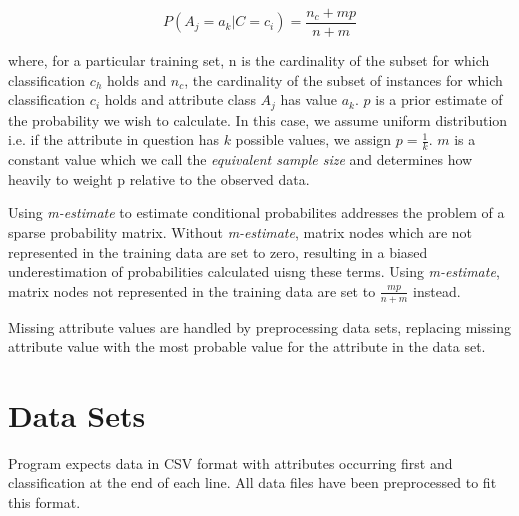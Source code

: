 \documentclass[10pt]{report}
\begin{document}
\begin{equation*}
P(A_{j}=a_{k}|C=c_{i}) = \frac{n_{c} + mp}{n + m}
\end{equation*}

where, for a particular training set, n is the cardinality of the
subset for which classification \(c_h\) holds and \(n_c\), the
cardinality of the subset of instances for which classification
\(c_i\) holds and attribute class \(A_j\) has value \(a_k\). \(p\) is
a prior estimate of the probability we wish to calculate. In this
case, we assume uniform distribution i.e. if the attribute in question
has \(k\) possible values, we assign \(p = \frac{1}{k}\). \(m\) is a
constant value which we call the \textit{equivalent sample size} and
determines how heavily to weight p relative to the observed
data. 

Using \textit{m-estimate} to estimate conditional probabilites
addresses the problem of a sparse probability matrix. Without
\textit{m-estimate}, matrix nodes which are not represented in the
training data are set to zero, resulting in a biased underestimation
of probabilities calculated uisng these terms. Using
\textit{m-estimate}, matrix nodes not represented in the training data
are set to \(\frac{mp}{n + m}\) instead.

Missing attribute values are handled by preprocessing data sets,
replacing missing attribute value with the most probable value for the
attribute in the data set.

\cite{*}

\section{Data Sets}
Program expects data in CSV format with attributes occurring first and
classification at the end of each line. All data files have been
preprocessed to fit this format.
\end{document}
